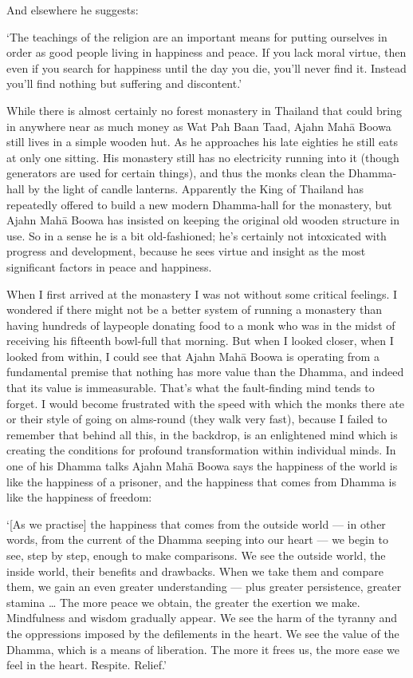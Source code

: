 And elsewhere he suggests:

`The teachings of the religion are an important means for putting
ourselves in order as good people living in happiness and peace. If you
lack moral virtue, then even if you search for happiness until the day
you die, you'll never find it. Instead you'll find nothing but suffering
and discontent.'

While there is almost certainly no forest monastery in Thailand that
could bring in anywhere near as much money as Wat Pah Baan Taad, Ajahn
Mahā Boowa still lives in a simple wooden hut. As he approaches his late
eighties he still eats at only one sitting. His monastery still has no
electricity running into it (though generators are used for certain
things), and thus the monks clean the Dhamma-hall by the light of candle
lanterns. Apparently the King of Thailand has repeatedly offered to
build a new modern Dhamma-hall for the monastery, but Ajahn Mahā Boowa
has insisted on keeping the original old wooden structure in use. So in
a sense he is a bit old-fashioned; he's certainly not intoxicated with
progress and development, because he sees virtue and insight as the most
significant factors in peace and happiness.

When I first arrived at the monastery I was not without some critical
feelings. I wondered if there might not be a better system of running a
monastery than having hundreds of laypeople donating food to a monk who
was in the midst of receiving his fifteenth bowl-full that morning. But
when I looked closer, when I looked from within, I could see that Ajahn
Mahā Boowa is operating from a fundamental premise that nothing has more
value than the Dhamma, and indeed that its value is immeasurable. That's
what the fault-finding mind tends to forget. I would become frustrated
with the speed with which the monks there ate or their style of going on
alms-round (they walk very fast), because I failed to remember that
behind all this, in the backdrop, is an enlightened mind which is
creating the conditions for profound transformation within individual
minds. In one of his Dhamma talks Ajahn Mahā Boowa says the happiness of
the world is like the happiness of a prisoner, and the happiness that
comes from Dhamma is like the happiness of freedom:

`{[}As we practise{]} the happiness that comes from the outside world
--- in other words, from the current of the Dhamma seeping into our
heart --- we begin to see, step by step, enough to make comparisons. We
see the outside world, the inside world, their benefits and drawbacks.
When we take them and compare them, we gain an even greater
understanding --- plus greater persistence, greater stamina \ldots{} The
more peace we obtain, the greater the exertion we make. Mindfulness and
wisdom gradually appear. We see the harm of the tyranny and the
oppressions imposed by the defilements in the heart. We see the value of
the Dhamma, which is a means of liberation. The more it frees us, the
more ease we feel in the heart. Respite. Relief.'

